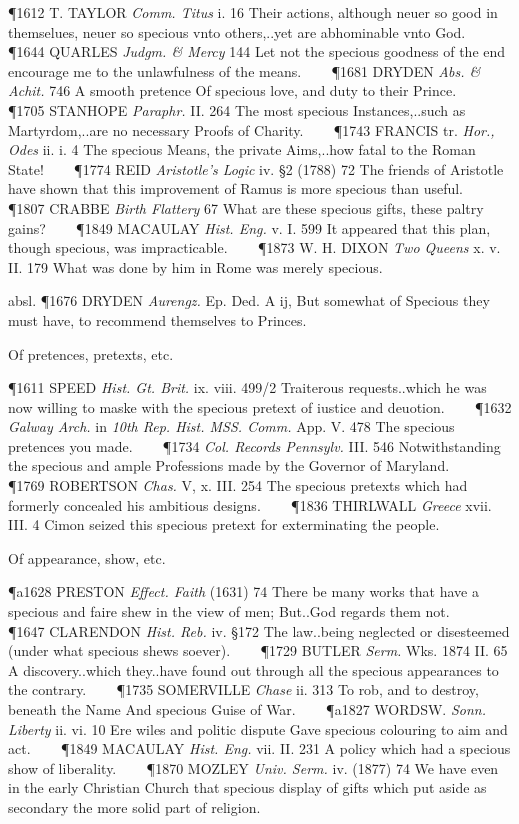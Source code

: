 \begin{description}[wide, labelwidth=!, labelindent=0pt]
\begin{myenumerate}
\P 1612 T. TAYLOR  \textit{Comm. Titus} i. 16 Their actions, although neuer so good in themselues, neuer so specious vnto others,..yet are abhominable vnto God.    
\P 1644 QUARLES  \textit{Judgm. \& Mercy} 144 Let not the specious goodness of the end encourage me to the unlawfulness of the means.    
\P 1681 DRYDEN  \textit{Abs. \& Achit.} 746 A smooth pretence Of specious love, and duty to their Prince.    
\P 1705 STANHOPE  \textit{Paraphr.} II. 264 The most specious Instances,..such as Martyrdom,..are no necessary Proofs of Charity.    
\P 1743 FRANCIS tr.  \textit{Hor., Odes} ii. i. 4 The specious Means, the private Aims,..how fatal to the Roman State!    
\P 1774 REID  \textit{Aristotle's Logic} iv. §2 (1788) 72 The friends of Aristotle have shown that this improvement of Ramus is more specious than useful.    
\P 1807 CRABBE  \textit{Birth Flattery} 67 What are these specious gifts, these paltry gains?    
\P 1849 MACAULAY  \textit{Hist. Eng.} v. I. 599 It appeared that this plan, though specious, was impracticable.    
\P 1873 W. H. DIXON  \textit{Two Queens} x. v. II. 179 What was done by him in Rome was merely specious.

absl. \P 1676 DRYDEN  \textit{Aurengz.} Ep. Ded. A ij, But somewhat of Specious they must have, to recommend themselves to Princes.

 Of pretences, pretexts, etc.

\P 1611 SPEED  \textit{Hist. Gt. Brit.} ix. viii. 499/2 Traiterous requests..which he was now willing to maske with the specious pretext of iustice and deuotion.    
\P 1632 \textit{Galway Arch.} in  \textit{10th Rep. Hist. MSS. Comm.} App. V. 478 The specious pretences you made.    
\P 1734 \textit{Col. Records Pennsylv.} III. 546 Notwithstanding the specious and ample Professions made by the Governor of Maryland.    
\P 1769 ROBERTSON  \textit{Chas.} V, x. III. 254 The specious pretexts which had formerly concealed his ambitious designs.    
\P 1836 THIRLWALL  \textit{Greece} xvii. III. 4 Cimon seized this specious pretext for exterminating the people.

 Of appearance, show, etc.

\P a1628 PRESTON  \textit{Effect. Faith} (1631) 74 There be many works that have a specious and faire shew in the view of men; But..God regards them not.    
\P 1647 CLARENDON  \textit{Hist. Reb.} iv. §172 The law..being neglected or disesteemed (under what specious shews soever).    
\P 1729 BUTLER \textit{Serm.} Wks. 1874 II. 65 A  discovery..which they..have found out through all the specious appearances to the contrary.    
\P 1735 SOMERVILLE  \textit{Chase} ii. 313 To rob, and to destroy, beneath the Name And specious Guise of War.    
\P a1827 WORDSW.  \textit{Sonn. Liberty} ii. vi. 10 Ere wiles and politic dispute Gave specious colouring to aim and act.    
\P 1849 MACAULAY  \textit{Hist. Eng.} vii. II. 231 A policy which had a specious show of liberality.    
\P 1870 MOZLEY  \textit{Univ. Serm.} iv. (1877) 74 We have even in the early Christian Church that specious display of gifts which put aside as secondary the more solid part of religion.


\end{myenumerate}
\end{description}
